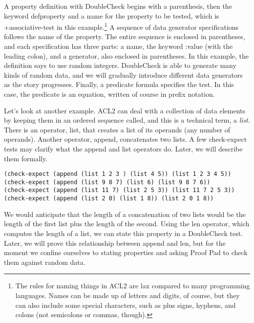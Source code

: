 A property definition with
DoubleCheck begins with a parenthesis, then the keyword
\textsf{defproperty}
and a name for the property to be tested,
which is \textsf{+associative-test} in this example.\footnote{The
rules for naming things in ACL2 are lax compared to many
programming languages. Names can be made up of letters and digits, of course,
but they can also include some special characters,
such as plus signs, hyphens, and colons (not semicolons or commas, though).}
A sequence of data generator specifications follows the name of the property.
The entire sequence is enclosed in parentheses,
and each specification has three parts: a name,
the keyword \textsf{:value} (with the leading colon),
and a generator, also enclosed in parentheses.
In this example, the definition says to use random integers.
DoubleCheck is able to generate many kinds of random data,
and we will gradually introduce different data generators as the story progresses.
Finally, a predicate formula specifies the test.
In this case, the predicate is an equation,
written of course in prefix notation.

Let's look at another example.
ACL2 can deal with a collection of data elements
by keeping them in an ordered sequence
called, and this is a technical term, a
\emph{list}.
There is an operator,
\label{list-op-informal}\textsf{list},
that creates a list of its operands
(any number of operands).
Another operator,
\label{append-op-informal}\textsf{append},
concatenates two lists.
A few \textsf{check-expect} tests may clarify
what the \textsf{append} and \textsf{list} operators do.
Later, we will describe them formally.

\begin{code}
\begin{verbatim}
(check-expect (append (list 1 2 3 ) (list 4 5)) (list 1 2 3 4 5))
(check-expect (append (list 9 8 7) (list 6) (list 9 8 7 6))
(check-expect (append (list 11 7) (list 2 5 3)) (list 11 7 2 5 3))
(check-expect (append (list 2 0) (list 1 8)) (list 2 0 1 8))
\end{verbatim}	
\end{code}

We would anticipate that the length of a concatenation of two lists
would be the length of the first list plus the length of the second.
Using the
\label{len-op-informal}\textsf{len}
operator, which computes the length of a list,
we can state this property in a DoubleCheck test.
Later, we will prove this relationship between \textsf{append} and \textsf{len},
but for the moment we confine ourselves to stating properties
and asking Proof Pad to check them against random data.

